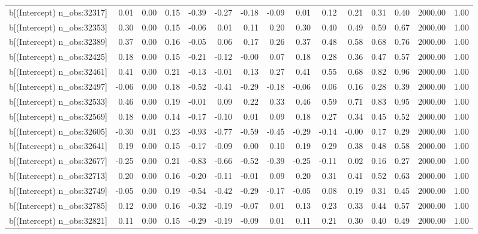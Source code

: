 \begin{table}[ht]
\begin{tabular}{rrrrrrrrrrrrrrr}
  b[(Intercept) n\_obs:32317] & 0.01 & 0.00 & 0.15 & -0.39 & -0.27 & -0.18 & -0.09 & 0.01 & 0.12 & 0.21 & 0.31 & 0.40 & 2000.00 & 1.00 \\ 
  b[(Intercept) n\_obs:32353] & 0.30 & 0.00 & 0.15 & -0.06 & 0.01 & 0.11 & 0.20 & 0.30 & 0.40 & 0.49 & 0.59 & 0.67 & 2000.00 & 1.00 \\ 
  b[(Intercept) n\_obs:32389] & 0.37 & 0.00 & 0.16 & -0.05 & 0.06 & 0.17 & 0.26 & 0.37 & 0.48 & 0.58 & 0.68 & 0.76 & 2000.00 & 1.00 \\ 
  b[(Intercept) n\_obs:32425] & 0.18 & 0.00 & 0.15 & -0.21 & -0.12 & -0.00 & 0.07 & 0.18 & 0.28 & 0.36 & 0.47 & 0.57 & 2000.00 & 1.00 \\ 
  b[(Intercept) n\_obs:32461] & 0.41 & 0.00 & 0.21 & -0.13 & -0.01 & 0.13 & 0.27 & 0.41 & 0.55 & 0.68 & 0.82 & 0.96 & 2000.00 & 1.00 \\ 
  b[(Intercept) n\_obs:32497] & -0.06 & 0.00 & 0.18 & -0.52 & -0.41 & -0.29 & -0.18 & -0.06 & 0.06 & 0.16 & 0.28 & 0.39 & 2000.00 & 1.00 \\ 
  b[(Intercept) n\_obs:32533] & 0.46 & 0.00 & 0.19 & -0.01 & 0.09 & 0.22 & 0.33 & 0.46 & 0.59 & 0.71 & 0.83 & 0.95 & 2000.00 & 1.00 \\ 
  b[(Intercept) n\_obs:32569] & 0.18 & 0.00 & 0.14 & -0.17 & -0.10 & 0.01 & 0.09 & 0.18 & 0.27 & 0.34 & 0.45 & 0.52 & 2000.00 & 1.00 \\ 
  b[(Intercept) n\_obs:32605] & -0.30 & 0.01 & 0.23 & -0.93 & -0.77 & -0.59 & -0.45 & -0.29 & -0.14 & -0.00 & 0.17 & 0.29 & 2000.00 & 1.00 \\ 
  b[(Intercept) n\_obs:32641] & 0.19 & 0.00 & 0.15 & -0.17 & -0.09 & 0.00 & 0.10 & 0.19 & 0.29 & 0.38 & 0.48 & 0.58 & 2000.00 & 1.00 \\ 
  b[(Intercept) n\_obs:32677] & -0.25 & 0.00 & 0.21 & -0.83 & -0.66 & -0.52 & -0.39 & -0.25 & -0.11 & 0.02 & 0.16 & 0.27 & 2000.00 & 1.00 \\ 
  b[(Intercept) n\_obs:32713] & 0.20 & 0.00 & 0.16 & -0.20 & -0.11 & -0.01 & 0.09 & 0.20 & 0.31 & 0.41 & 0.52 & 0.63 & 2000.00 & 1.00 \\ 
  b[(Intercept) n\_obs:32749] & -0.05 & 0.00 & 0.19 & -0.54 & -0.42 & -0.29 & -0.17 & -0.05 & 0.08 & 0.19 & 0.31 & 0.45 & 2000.00 & 1.00 \\ 
  b[(Intercept) n\_obs:32785] & 0.12 & 0.00 & 0.16 & -0.32 & -0.19 & -0.07 & 0.01 & 0.13 & 0.23 & 0.33 & 0.44 & 0.57 & 2000.00 & 1.00 \\ 
  b[(Intercept) n\_obs:32821] & 0.11 & 0.00 & 0.15 & -0.29 & -0.19 & -0.09 & 0.01 & 0.11 & 0.21 & 0.30 & 0.40 & 0.49 & 2000.00 & 1.00 \\ 

\end{tabular}
\end{table}
